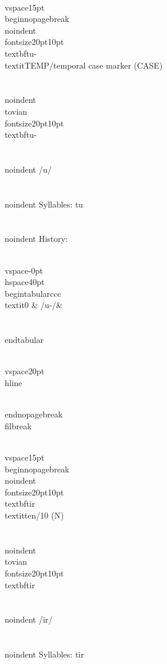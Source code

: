 \\vspace{15pt}
\\begin{nopagebreak}
\\noindent{\\fontsize{20pt}{10pt}\\textbf{tu-} } \\textit{TEMP/temporal case marker} (CASE)\\\\
\\noindent {\\tovian \\fontsize{20pt}{10pt} \\textbf{tu-} }\\\\
\\noindent /{}{\textprimstress}u/\\\\
\\noindent Syllables: tu\\\\


\\noindent History:

\\vspace{-0pt}
\\hspace{40pt}
\\begin{tabular}{ccc}
\\textit{0} & /{}u-/& \\\\
\\end{tabular}

\\vspace{20pt}\\hline

\\end{nopagebreak}
\\filbreak



\\vspace{15pt}
\\begin{nopagebreak}
\\noindent{\\fontsize{20pt}{10pt}\\textbf{tir} } \\textit{ten/10} (N)\\\\
\\noindent {\\tovian \\fontsize{20pt}{10pt} \\textbf{tir} }\\\\
\\noindent /{}{\textprimstress}ir/\\\\
\\noindent Syllables: tir\\\\


